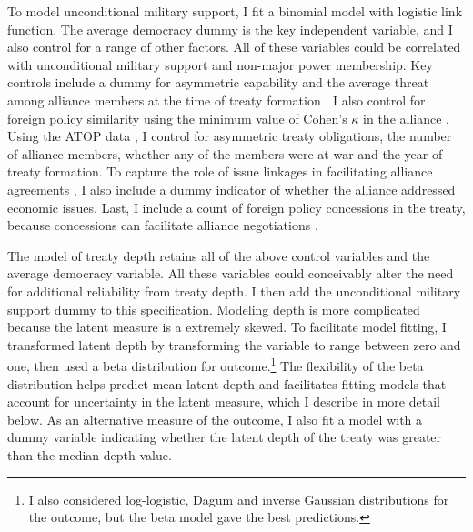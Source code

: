 \documentclass[12pt]{article}
\begin{document}
To model unconditional military support, I fit a binomial model with logistic link function. 
The average democracy dummy is the key independent variable, and I also control for a range of other factors.
All of these variables could be correlated with unconditional military support and non-major power membership. 
Key controls include a dummy for asymmetric capability \citep{Mattes2012} and the average threat among alliance members at the time of treaty formation \citep{LeedsSavun2007}. 
I also control for foreign policy similarity \citep{Benson2012} using the minimum value of Cohen's $\kappa$ in the alliance \citep{Hage2011}.
Using the ATOP data \citep{Leedsetal2002}, I control for asymmetric treaty obligations, the number of alliance members, whether any of the members were at war and the year of treaty formation. 
To capture the role of issue linkages in facilitating alliance agreements \citep{Poast2012, Poast2013}, I also include a dummy indicator of whether the alliance addressed economic issues.  
Last, I include a count of foreign policy concessions in the treaty, because concessions can facilitate alliance negotiations \citep{Johnson2015}. 


The model of treaty depth retains all of the above control variables and the average democracy variable. 
All these variables could conceivably alter the need for additional reliability from treaty depth. 
I then add the unconditional military support dummy to this specification. 
Modeling depth is more complicated because the latent measure is a extremely skewed.
To facilitate model fitting, I transformed latent depth by transforming the variable to range between zero and one, then used a beta distribution for outcome.\footnote{I also considered log-logistic, Dagum and inverse Gaussian distributions for the outcome, but the beta model gave the best predictions.}
The flexibility of the beta distribution helps predict mean latent depth and facilitates fitting models that account for uncertainty in the latent measure, which I describe in more detail below. 
As an alternative measure of the outcome, I also fit a model with a dummy variable indicating whether the latent depth of the treaty was greater than the median depth value. 
\end{document}
